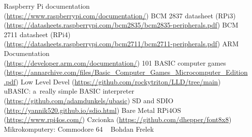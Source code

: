 \documentclass[shortabstract]{iithesis}
\begin{document}
\begin{thebibliography}{1}

\bibitem{} Raspberry Pi documentation\\(\url{https://www.raspberrypi.com/documentation/})
\bibitem{} BCM 2837 datasheet (RPi3)\\(\url{https://datasheets.raspberrypi.com/bcm2835/bcm2835-peripherals.pdf})
\bibitem{} BCM 2711 datasheet (RPi4)\\(\url{https://datasheets.raspberrypi.com/bcm2711/bcm2711-peripherals.pdf})
\bibitem{} ARM Documentation \\(\url{https://developer.arm.com/documentation/})
\bibitem{} 101 BASIC computer games\\(\url{https://annarchive.com/files/Basic_Computer_Games_Microcomputer_Edition.pdf})
\bibitem{} Low Level Devel (\url{https://github.com/rockytriton/LLD/tree/main})
\bibitem{} uBASIC: a~really simple BASIC interpreter\\ (\url{https://github.com/adamdunkels/ubasic})
\bibitem{} SD and SDIO (\url{http://yannik520.github.io/sdio.html})
\bibitem{} Bare Metal RPi4OS (\url{https://www.rpi4os.com/})
\bibitem{} Czcionka (\url{https://github.com/dhepper/font8x8})
\bibitem{} Mikrokomputery: Commodore 64 ~ Bohdan Frelek

\end{thebibliography}
\end{document}
